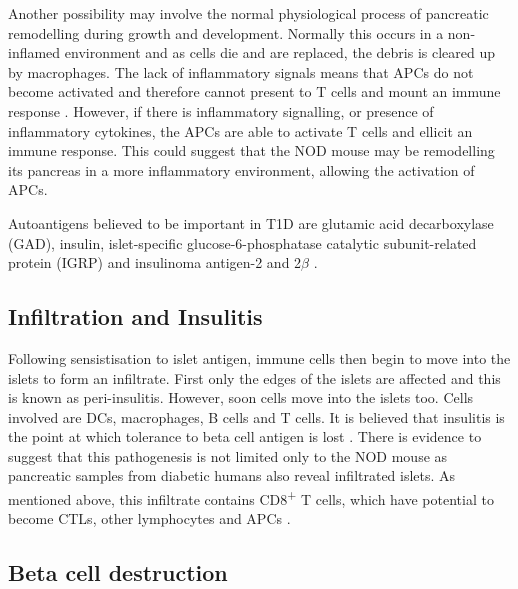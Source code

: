Another possibility may involve the normal physiological process of pancreatic remodelling during growth and development.
Normally this occurs in a non-inflamed environment and as cells die and are replaced, the debris is cleared up by macrophages.
The lack of inflammatory signals means that APCs do not become activated and therefore cannot present to T cells and mount an immune response \citep{Green1999}.
However, if there is inflammatory signalling, or presence of inflammatory cytokines, the APCs are able to activate T cells and ellicit an immune response.
This could suggest that the NOD mouse may be remodelling its pancreas in a more inflammatory environment, allowing the activation of APCs.

Autoantigens believed to be important in T1D are glutamic acid decarboxylase (GAD), insulin, islet-specific glucose-6-phosphatase catalytic subunit-related protein (IGRP) and insulinoma antigen-2 and 2$\beta$ \citep{Green1999, Roep2012}.


\subsection{Infiltration and Insulitis}

Following sensistisation to islet antigen, immune cells then begin to move into the islets to form an infiltrate.
First only the edges of the islets are affected and this is known as peri-insulitis\citep{Thomas2000}.
However, soon cells move into the islets too.
Cells involved are DCs, macrophages, B cells and T cells\citep{Brodie2008}.
It is believed that insulitis is the point at which tolerance to beta cell antigen is lost \citep{Thomas2000}.
There is evidence to suggest that this pathogenesis is not limited only to the NOD mouse as pancreatic samples from diabetic humans also reveal infiltrated islets.
As mentioned above, this infiltrate contains CD8\textsuperscript{+} T cells, which have potential to become CTLs, other lymphocytes and APCs \citep{Hanafusa2008}.

\subsection{Beta cell destruction}

